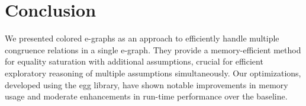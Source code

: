 \section{Conclusion}
\label{colors:conclusions}




\begin{comment}
In conclusion, this paper has introduced the concept of colored e-graphs as a memory-efficient method for maintaining multiple congruence relations in a single e-graph. 
It provides support for equality saturation with additional assumptions over e-graphs, thereby enabling efficient exploratory reasoning of multiple assumptions simultaneously.
The development of several optimizations based on the egg library and deferred rebuilding, and subsequent evaluation has validated our approach, demonstrating a significant improvement in memory utilization and a modest one for run-time performance compared to the baseline.
\end{comment}

We presented colored e-graphs as an approach to efficiently handle multiple congruence relations in a single e-graph.
They provide a memory-efficient method for equality saturation with additional assumptions, crucial for efficient exploratory reasoning of multiple assumptions simultaneously.
Our optimizations, developed using the egg library, have shown notable improvements in memory usage and moderate enhancements in run-time performance over the baseline.

